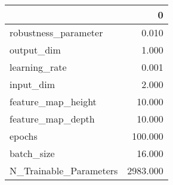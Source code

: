 \begin{tabular}{lr}
\toprule
{} &         0 \\
\midrule
robustness\_parameter   &     0.010 \\
output\_dim             &     1.000 \\
learning\_rate          &     0.001 \\
input\_dim              &     2.000 \\
feature\_map\_height     &    10.000 \\
feature\_map\_depth      &    10.000 \\
epochs                 &   100.000 \\
batch\_size             &    16.000 \\
N\_Trainable\_Parameters &  2983.000 \\
\bottomrule
\end{tabular}
